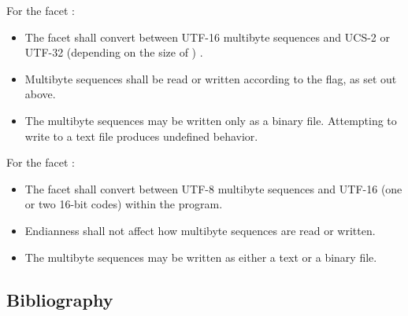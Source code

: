 \documentclass{wg21}
\begin{document}
\pnum
{}%
%
%
For the facet :
\begin{itemize}
    \item
    The facet shall convert between UTF-16 multibyte sequences
    and UCS-2 or UTF-32 (depending on the size of )
    .
    \item
    Multibyte sequences shall be read or written
    according to the  flag, as set out above.
    \item
    The multibyte sequences may be written only as a binary file.
    Attempting to write to a text file produces undefined behavior.
\end{itemize}

\pnum
{}%
%
For the facet :
\begin{itemize}
    \item
    The facet shall convert between UTF-8 multibyte sequences
    and UTF-16 (one or two 16-bit codes) within the program.
    \item
    Endianness shall not affect how multibyte sequences are read or written.
    \item
    The multibyte sequences may be written as either a text or a binary file.
\end{itemize}

\pnum
{}


\subsection{Bibliography}
\end{document}
